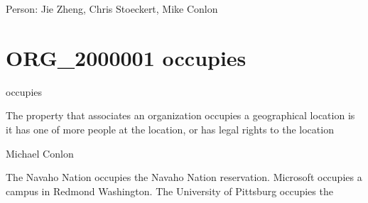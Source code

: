 \documentclass[letterpaper,10pt,english]{sphinxmanual}
\begin{document}
\begin{sphinxShadowBox}

\sphinxAtStartPar
{}
\end{sphinxShadowBox}

\begin{sphinxShadowBox}

\sphinxAtStartPar
Person: Jie Zheng, Chris Stoeckert, Mike Conlon
\end{sphinxShadowBox}
\begin{quote}
\label{\detokenize{doc-ORG_2000001:org-2000001}}\label{\detokenize{doc-ORG_2000001:occupies}}\label{\detokenize{doc-ORG_2000001:org-2000001}}
\ignorespaces \end{quote}


\section{ORG\_2000001 \sphinxhyphen{} occupies}
\label{\detokenize{doc-ORG_2000001:org-2000001-occupies}}\label{\detokenize{doc-ORG_2000001:index-0}}\label{\detokenize{doc-ORG_2000001::doc}}
\begin{sphinxShadowBox}

\sphinxAtStartPar
occupies
\end{sphinxShadowBox}

\begin{sphinxShadowBox}

\sphinxAtStartPar
The property that associates an organization occupies a geographical location is it has one of more people at the location, or has legal rights to the location
\end{sphinxShadowBox}

\begin{sphinxShadowBox}

\sphinxAtStartPar
Michael Conlon 
\end{sphinxShadowBox}

\begin{sphinxShadowBox}

\sphinxAtStartPar
The Navaho Nation occupies the Navaho Nation reservation.  Microsoft occupies a campus in Redmond Washington.  The University of Pittsburg occupies the
\end{sphinxShadowBox}
\end{document}
